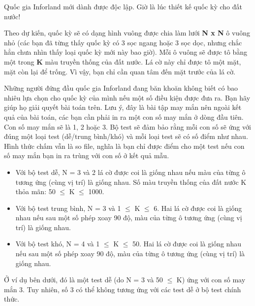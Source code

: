 



   Quốc gia Inforland mới dành được độc lập. Giờ là lúc thiết kế quốc kỳ cho đất nước!   





   Theo dự kiến, quốc kỳ sẽ có dạng hình vuông được chia làm lưới   \textbf{    N x N   }   ô vuông nhỏ (các bạn đã từng thấy quốc kỳ có 3 sọc ngang hoặc 3 sọc dọc, nhưng chắc hẳn chưa nhìn thấy loại quốc kỳ mới này bao giờ). Mỗi ô vuông sẽ được tô bằng một trong   \textbf{    K   }   màu truyền thống của đất nước. Lá cờ này chỉ được tô một mặt, mặt còn lại để trống. Vì vậy, bạn chỉ cần quan tâm đến mặt trước của lá cờ.  

   Những người đứng đầu quốc gia Inforland đang băn khoăn không biết có bao nhiêu lựa chọn cho quốc kỳ của mình nếu một số điều kiện được đưa ra. Bạn hãy giúp họ giải quyết bài toán trên. Lưu ý, đây là bài tập may mắn nên ngoài kết quả của bài toán, các bạn cần phải in ra một con số may mắn ở dòng đầu tiên. Con số may mắn sẽ là 1, 2 hoặc 3. Bộ test sẽ đảm bảo rằng mỗi con số sẽ ứng với đúng một loại test (dễ/trung bình/khó) và mỗi loại test sẽ có số điểm như nhau. Hình thức chấm vẫn là so file, nghĩa là bạn chỉ được điểm cho một test nếu con số may mắn bạn in ra trùng với con số ở kết quả mẫu.  
\begin{itemize}
	\item     Với bộ test dễ, N = 3 và 2 lá cờ được coi là giống nhau nếu màu của từng ô tương ứng (cùng vị trí) là giống nhau. Số màu truyền thống của đất nước K thỏa mãn: 50  $\le$  K  $\le$  1000.   
\end{itemize}
\begin{itemize}
	\item     Với bộ test trung bình, N = 3 và 1  $\le$  K  $\le$  6. Hai lá cờ được coi là giống nhau nếu sau một số phép xoay 90 độ, màu của từng ô tương ứng (cùng vị trí) là giống nhau.   
\end{itemize}
\begin{itemize}
	\item     Với bộ test khó, N = 4 và 1  $\le$  K  $\le$  50. Hai lá cờ được coi là giống nhau nếu sau một số phép xoay 90 độ, màu của từng ô tương ứng (cùng vị trí) là giống nhau.   
\end{itemize}

   Ở ví dụ bên dưới, đó là một test dễ (do N = 3 và 50  $\le$  K) ứng với con số may mắn 3. Tuy nhiên, số 3 có thể không tương ứng với các test dễ ở bộ test chính thức.  

